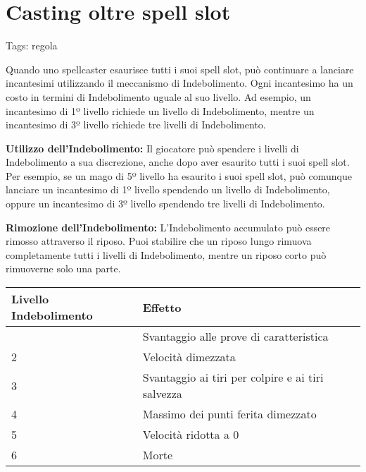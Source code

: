 \section{Casting oltre spell slot}\label{casting-oltre-spell-slot}

Tags: regola

Quando uno spellcaster esaurisce tutti i suoi spell slot, può continuare
a lanciare incantesimi utilizzando il meccanismo di Indebolimento. Ogni
incantesimo ha un costo in termini di Indebolimento uguale al suo
livello. Ad esempio, un incantesimo di 1º livello richiede un livello di
Indebolimento, mentre un incantesimo di 3º livello richiede tre livelli
di Indebolimento.

\textbf{Utilizzo dell'Indebolimento:} Il giocatore può spendere i
livelli di Indebolimento a sua discrezione, anche dopo aver esaurito
tutti i suoi spell slot. Per esempio, se un mago di 5º livello ha
esaurito i suoi spell slot, può comunque lanciare un incantesimo di 1º
livello spendendo un livello di Indebolimento, oppure un incantesimo di
3º livello spendendo tre livelli di Indebolimento.

\textbf{Rimozione dell'Indebolimento:} L'Indebolimento accumulato può
essere rimosso attraverso il riposo. Puoi stabilire che un riposo lungo
rimuova completamente tutti i livelli di Indebolimento, mentre un riposo
corto può rimuoverne solo una parte.

\begin{longtable}[]{@{}ll@{}}
\toprule\noalign{}
Livello Indebolimento & Effetto \\
\midrule\noalign{}
\endhead
\bottomrule\noalign{}
\endlastfoot
1 & Svantaggio alle prove di caratteristica \\
2 & Velocità dimezzata \\
3 & Svantaggio ai tiri per colpire e ai tiri salvezza \\
4 & Massimo dei punti ferita dimezzato \\
5 & Velocità ridotta a 0 \\
6 & Morte \\
\end{longtable}
